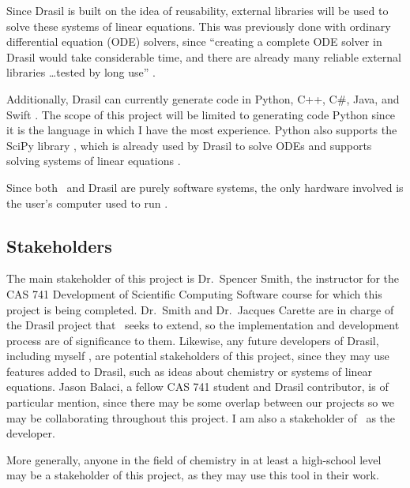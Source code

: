 \documentclass{article}
\begin{document}
Since Drasil is built on the idea of reusability, external libraries will be
used to solve these systems of linear equations. This was previously done with
ordinary differential equation (ODE) solvers, since ``creating a complete ODE
solver in Drasil would take considerable time, and there are already many
reliable external libraries \dots tested by long use''
\cite[p. 24]{chen_solving_2022}.

Additionally, Drasil can currently generate code in Python, C++, C\#, Java, and
Swift \cite{chen_solving_2022}. The scope of this project will be limited to 
generating code Python since it is the language in which I 
have the most experience. Python also supports the SciPy library
\cite{2020SciPy-NMeth}, which is already used by Drasil to solve ODEs
\cite{chen_solving_2022} and supports solving systems of linear equations \cite{the_scipy_community_scipylinalgsolve_2023}.


Since both \progname~and Drasil are purely software systems, the only
hardware involved is the user's computer used to run \progname.

\subsection{Stakeholders}
The main stakeholder of this project is Dr.~Spencer Smith, the instructor for
the CAS 741 Development of Scientific Computing Software course for which this
project is being completed. Dr.~Smith and Dr.~Jacques Carette are in charge of
the Drasil project that \progname~seeks to extend, so the implementation and
development process are of significance to them. Likewise, any future
developers of Drasil, including myself , are
potential stakeholders of this project, since they may use features added to
Drasil, such as ideas about chemistry or systems of linear equations. Jason
Balaci, a fellow CAS 741 student and Drasil contributor, is of particular 
mention, since
there may be some overlap between our projects so we may be collaborating
throughout this project. I am also a stakeholder of \progname~as the
developer.

More generally, anyone in the field of chemistry in at least a high-school level
may be a stakeholder of this project, as they may use this tool in their work.
\end{document}
